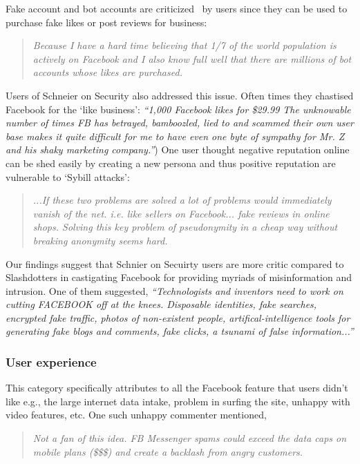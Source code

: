     Fake account and bot accounts are criticized~\cite{ferrara2016rise} by users since they can be used to purchase fake likes or post reviews for business:
    \begin{quote}
         \textit{Because I have a hard time believing that 1/7 of the world population is actively on Facebook and I also know full well that there are millions of bot accounts whose likes are purchased. }
    \end{quote}
    
    Users of Schneier on Security also addressed this issue. Often times they chastised Facebook for the `like business': \textit{``1,000 Facebook likes for \$29.99 The unknowable number of times FB has betrayed, bamboozled, lied to and scammed their own user base makes it quite difficult for me to have even one byte of sympathy for Mr. Z and his shaky marketing company.''}) One user thought negative reputation online can be shed easily by creating a new persona and thus positive reputation are vulnerable to `Sybill attacks':
    \begin{quote}
         \textit{...If these two problems are solved a lot of problems would immediately vanish of the net. i.e. like sellers on Facebook... fake reviews in online shops. Solving this key problem of pseudonymity in a cheap way without breaking anonymity seems hard. }
    \end{quote}
    
    Our findings suggest that Schnier on Secuirty users are more critic compared to Slashdotters in castigating Facebook for providing myriads of misinformation and intrusion. One of them suggested, \textit{``Technologists and inventors need to work on cutting FACEBOOK off at the knees. Disposable identities, fake searches, encrypted fake traffic, photos of non-existent people, artifical-intelligence tools for generating fake blogs and comments, fake clicks, a tsunami of false information...''}
    
 \subsubsection{User experience}
 This category specifically attributes to all the Facebook feature that users didn't like e.g., the large internet data intake, problem in surfing the site, unhappy with video features, etc. One such unhappy commenter mentioned, 
     \begin{quote}
         \textit{Not a fan of this idea. FB Messenger spams could exceed the data caps on mobile plans (\$\$\$) and create a backlash from angry customers.}
     \end{quote}
    
